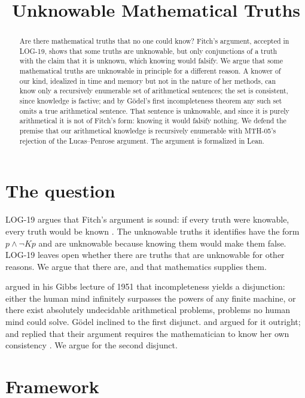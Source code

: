 \documentclass{situationist-preprint}
\title{Unknowable Mathematical Truths}
\begin{document}
\maketitle

\begin{abstract}
Are there mathematical truths that no one could know? Fitch's argument, accepted in LOG-19, shows that some truths are unknowable, but only conjunctions of a truth with the claim that it is unknown, which knowing would falsify. We argue that some mathematical truths are unknowable in principle for a different reason. A knower of our kind, idealized in time and memory but not in the nature of her methods, can know only a recursively enumerable set of arithmetical sentences; the set is consistent, since knowledge is factive; and by Gödel's first incompleteness theorem any such set omits a true arithmetical sentence. That sentence is unknowable, and since it is purely arithmetical it is not of Fitch's form: knowing it would falsify nothing. We defend the premise that our arithmetical knowledge is recursively enumerable with MTH-05's rejection of the Lucas--Penrose argument. The argument is formalized in Lean.
\end{abstract}

\section{The question}

LOG-19 argues that Fitch's argument is sound: if every truth were knowable, every truth would be known \citep{Fitch1963}. The unknowable truths it identifies have the form $p \wedge \neg Kp$ and are unknowable because knowing them would make them false. LOG-19 leaves open whether there are truths that are unknowable for other reasons. We argue that there are, and that mathematics supplies them.

\citet{Goedel1995} argued in his Gibbs lecture of 1951 that incompleteness yields a disjunction: either the human mind infinitely surpasses the powers of any finite machine, or there exist absolutely undecidable arithmetical problems, problems no human mind could solve. Gödel inclined to the first disjunct. \citet{Lucas1961} and \citet{Penrose1989} argued for it outright; \citet{Benacerraf1967} and \citet{Shapiro1998} replied that their argument requires the mathematician to know her own consistency \citep[see also][]{Feferman2006}. We argue for the second disjunct.

\section{Framework}
\end{document}

